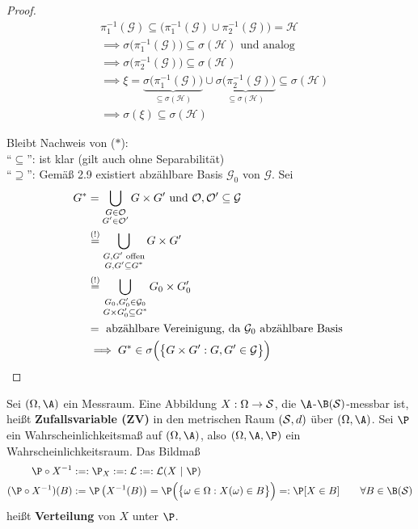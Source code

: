 \begin{proof}
\begin{align*}
		&\pi_1^{-1}(\mathcal{G})\subseteq\big(\pi_1^{-1}(\mathcal{G})\cup\pi_2^{-1}(\mathcal{G})\big)=\mathcal{H}\\
		&\implies
		\sigma\big(\pi_1^{-1}(\mathcal{G})\big)\subseteq\sigma(\mathcal{H})\text{ und analog }\\
		&\implies
		\sigma\big(\pi_2^{-1}(\mathcal{G})\big)\subseteq\sigma(\mathcal{H})\\
		&\implies
		\xi=\underbrace{\sigma\big(\pi_1^{-1}(\mathcal{G})\big)}_{\subseteq\sigma(\mathcal{H})}\cup\underbrace{\sigma\big(\pi_2^{-1}(\mathcal{G})\big)}_{\subseteq\sigma(\mathcal{H})}\subseteq\sigma(\mathcal{H})\\
		&\implies
		\sigma(\xi)\subseteq\sigma(\mathcal{H})
	\end{align*}

	Bleibt Nachweis von ($\ast$):\\
	``$\subseteq$'': ist klar (gilt auch ohne Separabilität)\\
	``$\supseteq$'': Gemäß 2.9 existiert abzählbare Basis $\mathcal{G}_0$  von $\mathcal{G}$. Sei
	\begin{align*}
		G^\ast&=\bigcup\limits_{\begin{subarray}{c}
			G\in\mathcal{O}\\
			G'\in\mathcal{O}'
		\end{subarray}}G\times G'\text{ und }\mathcal{O},\mathcal{O}'\subseteq\mathcal{G}\\
		&\stackeq{(!)}
		\bigcup\limits_{\begin{subarray}{c}
			G,G'\text{ offen}\\
			G,G'\subseteq G^\ast
		\end{subarray}}
		G\times G'\\
		&\stackeq{(!)}
		\bigcup\limits_{\begin{subarray}{c}
			G_0,G_0'\in\mathcal{G}_0\\
			G\times G_0'\subseteq G^\ast
		\end{subarray}}
		G_0\times G_0'\\
		&=\text{ abzählbare Vereinigung, da $\mathcal{G}_0$ abzählbare Basis }\\
		&\implies
		G^\ast\in\sigma\Big(\big\lbrace G\times G':G,G'\in\mathcal{G}\big\rbrace\Big)
	\end{align*}
\end{proof}

\begin{definition} %
	Sei $(\Omega,\A)$ ein Messraum.
	Eine Abbildung
	$X:\Omega\to\S$, die $\A$-$\B(\S)$-messbar ist, heißt \textbf{Zufallsvariable (ZV)} in den metrischen Raum $(\S,d)$ über $(\Omega,\A)$.\nl
	Sei $\P$ ein Wahrscheinlichkeitsmaß auf $(\Omega,\A)$, also $(\Omega,\A,\P)$ ein Wahrscheinlichkeitsraum. 
	Das Bildmaß
	\begin{align*}
		\P\circ X^{-1}&:=:\P_X:=:\mathcal{L}:=:\mathcal{L}(X~|~\P)\\
		(\P\circ X^{-1})(B)&:=\P\left(X^{-1}(B)\right)=\P\Big(\big\lbrace\omega\in\Omega:X(\omega)\in B\big\rbrace\Big)
		=: \P[X\in B]
		\qquad\forall B\in\B(\S)
	\end{align*}
	heißt \textbf{Verteilung} von $X$ unter $\P$.
\end{definition}


